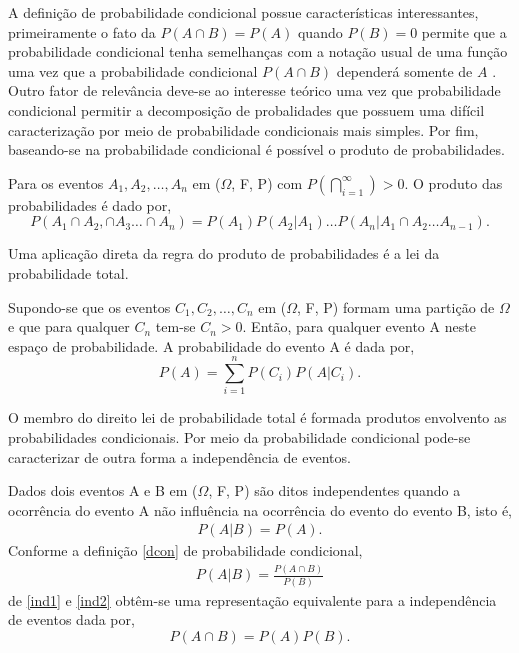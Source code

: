 A defini\c c\~ao de probabilidade condicional possue
caracter\'isticas interessantes, primeiramente o fato da $P(A \cap B) = P(A)$ quando $P(B) = 0$
permite que a probabilidade condicional tenha semelhan\c cas com a nota\c c\~ao usual de uma fun\c
c\~ao uma vez que a probabilidade condicional $P(A \cap B)$ depender\'a somente de $A$ \cite{james}.
Outro fator de relev\^ancia deve-se ao interesse te\'orico uma vez que probabilidade condicional
permitir a decomposi\c{c}\~{a}o de probalidades que possuem uma dif\'{i}cil caracteriza\c{c}\~{a}o
por meio de probabilidade condicionais mais simples\cite{magalhaes}. Por fim, baseando-se na
probabilidade condicional \'e poss\'ivel o produto de probabilidades.  
	\begin{prop} 
		Para os eventos $A_1,A_2, \dots, A_n$ em ($\Omega$, F, P)
		com $P( \bigcap\limits_{i = 1}^{\infty}) > 0 $.  O produto das probabilidades \'{e} dado por,
		\begin{equation*} P(A_1 \cap A_2, \cap A_3 \dots \cap A_n) = P(A_1)P(A_2 | A_1) \dots P(A_n|A_1
			\cap A_2 \dots A_{n-1}).  
		\end{equation*}
	\end{prop}
Uma aplica\c{c}\~{a}o direta da regra
do produto de probabilidades \'{e} a lei da probabilidade total.  
	\begin{teo}
		Supondo-se que os eventos $C_1,C_2,\dots, C_n$ em ($\Omega$, F, P) formam
		uma parti\c{c}\~{a}o de $\Omega$ e que para qualquer $C_n$ tem-se $C_n > 0$.  Ent\~{a}o, para
		qualquer evento A neste espa\c{c}o de probabilidade. A probabilidade do evento A \'{e} dada por,
			\begin{equation*}
				P(A) = \sum\limits_{i = 1}^{n} P(C_i)P(A|C_i).  
			\end{equation*} 
	\end{teo} 
O membro do direito lei de probabilidade total \'{e} formada produtos envolvento as probabilidades
condicionais.  Por meio da probabilidade condicional pode-se caracterizar de outra forma a
independ\^encia de eventos.  
	\begin{defin}
		\label{ind}
		Dados dois eventos A e B em ($\Omega$, F, P) s\~{a}o ditos independentes quando a ocorr\^{e}ncia do
		evento A n\~{a}o influ\^{e}ncia na ocorr\^{e}ncia do evento do evento B, isto \'{e},
			\begin{align}
				\label{ind1}
				P(A|B) = P(A). 
			\end{align}
		Conforme a defini\c{c}\~{a}o \autoref{dcon} de probabilidade condicional, 
		\begin{align}
			\label{ind2} 
			P(A|B) = \frac{P(A \cap B)} {P(B)} 
		\end{align}
		de \ref{ind1} e \ref{ind2} obt\^{e}m-se uma representa\c{c}\~{a}o
		equivalente para a independ\^{e}ncia de eventos dada por, 
		\begin{equation*}
			P(A \cap B) = P(A)P(B).  
		\end{equation*}  
	\end{defin}
